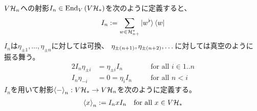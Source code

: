 {	$V{{\mathcal{H}}}_n$への射影$I_n\in{\ensuremath{\operatorname{End}}}_V\mathinner{\left({V{\ensuremath{{\mathcal{H}}}}_*}\right)}$を次のように定義すると、
	\begin{equation*}\begin{split}
		I_n := \sum_{w\in{\ensuremath{{\mathcal{H}}}}_{n+}^*}\mathinner{|{w^\flat}\rangle}\mathinner{\langle{w}|}
	\end{split}\end{equation*}
	$I_n$は$\eta_{\pm1},\dots,\eta_{\pm n}$に対しては可換、
	$\eta_{\pm\mathinner{\left({n+1}\right)}},\eta_{\pm\mathinner{\left({n+2}\right)}},\dots$に対しては真空のように
	振る舞う。
	\begin{alignat*}{2}
		I_n\eta_{\pm i} &= \eta_{\pm i}I_n &\quad&\text{for all } i\in1..n \\
		I_n\eta_{-i} &= 0 = \eta_iI_n &\quad&\text{for all } n < i
	\end{alignat*}
	$I_n$を用いて射影$\mathinner{\langle{-}\rangle}_n:V{{\mathcal{H}}}_*\to V{{\mathcal{H}}}_n$を次のように定義する。
	\begin{equation*}\begin{split}
		\mathinner{\langle{x}\rangle}_n := I_nxI_n \quad\text{for all } x\in V{{\mathcal{H}}}_*
	\end{split}\end{equation*}

}

